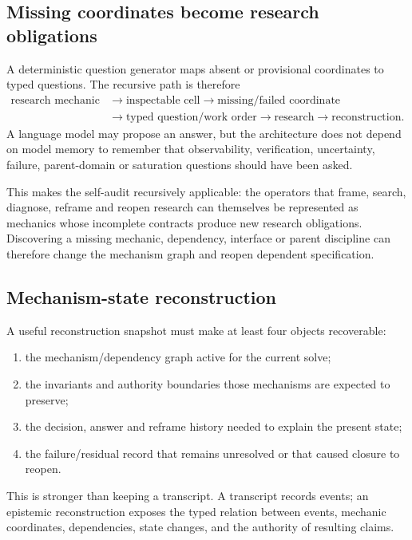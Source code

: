 \subsection{Missing coordinates become research obligations}

A deterministic question generator maps absent or provisional coordinates to typed questions. The recursive path is therefore
\[
\begin{aligned}
\text{research mechanic}&\rightarrow \text{inspectable cell}
\rightarrow \text{missing/failed coordinate}\\
&\rightarrow \text{typed question/work order}
\rightarrow \text{research}\rightarrow \text{reconstruction}.
\end{aligned}
\]
A language model may propose an answer, but the architecture does not depend on model memory to remember that observability, verification, uncertainty, failure, parent-domain or saturation questions should have been asked.

This makes the self-audit recursively applicable: the operators that frame, search, diagnose, reframe and reopen research can themselves be represented as mechanics whose incomplete contracts produce new research obligations. Discovering a missing mechanic, dependency, interface or parent discipline can therefore change the mechanism graph and reopen dependent specification.

\subsection{Mechanism-state reconstruction}

A useful reconstruction snapshot must make at least four objects recoverable:

\begin{enumerate}
  \item the mechanism/dependency graph active for the current solve;
  \item the invariants and authority boundaries those mechanisms are expected to preserve;
  \item the decision, answer and reframe history needed to explain the present state;
  \item the failure/residual record that remains unresolved or that caused closure to reopen.
\end{enumerate}

This is stronger than keeping a transcript. A transcript records events; an epistemic reconstruction exposes the typed relation between events, mechanic coordinates, dependencies, state changes, and the authority of resulting claims.

